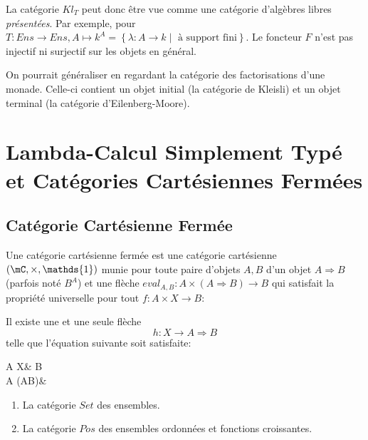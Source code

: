 \documentclass[math, info]{cours}
\begin{document}
La catégorie $Kl_{T}$ peut donc être vue comme une catégorie d'algèbres libres \emph{présentées}.
Par exemple, pour $T: Ens \to Ens, A\mapsto k^{A} = \left\{ \lambda: A \to k \mid \text{ à support fini} \right\}$.
Le foncteur $F$ n'est pas injectif ni surjectif sur les objets en général.

On pourrait généraliser en regardant la catégorie des factorisations d'une monade. Celle-ci contient un objet initial (la catégorie de Kleisli) et un objet terminal (la catégorie d'Eilenberg-Moore).

\section{Lambda-Calcul Simplement Typé et Catégories Cartésiennes Fermées}
\subsection{Catégorie Cartésienne Fermée}
\begin{definition}
	Une catégorie cartésienne fermée est une catégorie cartésienne $\left( \mC, \times, \mathds{1} \right)$ munie pour toute paire d'objets $A, B$ d'un objet $A \Rightarrow B$ (parfois noté $B^{A}$) et une flèche $eval_{A, B}: A \times (A\Rightarrow B) \to B$
	qui satisfait la propriété universelle pour tout $f: A \times X \to B$:
	\begin{center}
		Il existe une et une seule flèche
		\begin{equation*}
			h: X \longrightarrow A \Rightarrow B
		\end{equation*}
		telle que l'équation suivante soit satisfaite:
		\begin{category}
			A \times X\ar[r, "f"]\ar[d, "\id_{A} \times h"'] & B\\
			A \times (A\rightarrow B)\ar[ur, "eval_{A, B}"']&
		\end{category}
	\end{center}
\end{definition}

\begin{exemple}
	\begin{enumerate}
		\item La catégorie $Set$ des ensembles.
		\item La catégorie $Pos$ des ensembles ordonnées et fonctions croissantes.
	\end{enumerate}
\end{exemple}
\end{document}
